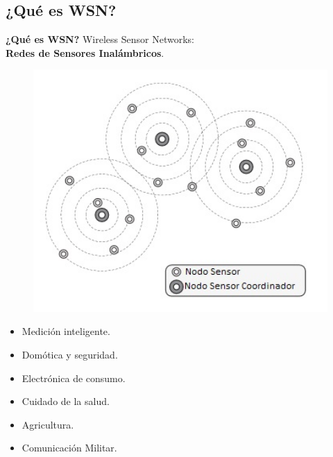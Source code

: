\documentclass[aspectratio=43, handout]{beamer}
\begin{document}
\subsection[WSN]{¿Qué es WSN?}
\begin{frame}{\textbf{\LARGE{¿Qué es WSN?}}}
\fontsize{14pt}{14}\selectfont
\noindent Wireless Sensor Networks:\\
\textbf{Redes de Sensores Inalámbricos}.
\begin{minipage}[c]{1.0\linewidth}
	\begin{minipage}[c]{0.41\linewidth}
		\begin{figure}[H]			
		\includegraphics[width=1.2\textwidth]{./imagenes/WSN.jpg}
		\end{figure}	  	  	
	\end{minipage}
	\begin{minipage}[c]{0.55\linewidth}
					\vspace{10px}
		\begin{itemize}
			\item Medición inteligente.
			\vspace{5px}
			\item Domótica y seguridad.
			\vspace{5px}
			\item Electrónica de consumo.
			\vspace{5px}
			\item Cuidado de la salud.
			\vspace{5px}
			\item Agricultura.
			\vspace{5px}
			\item Comunicación Militar.
			\vspace{5px}
		\end{itemize}
\end{minipage}
\end{minipage}
\end{frame}
\end{document}
